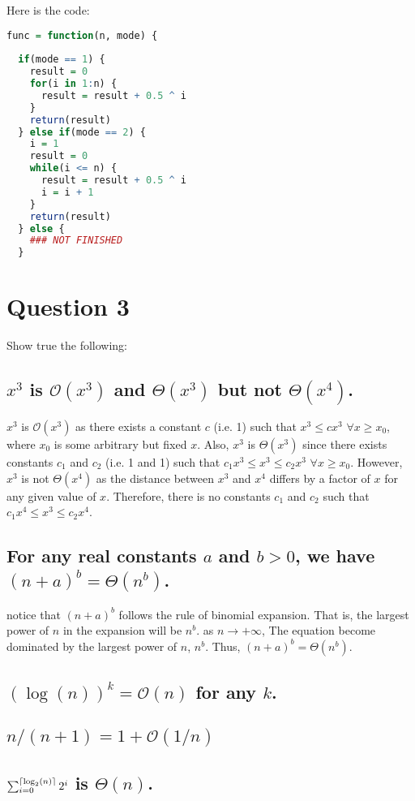 \documentclass[20pt]{article} %
\DeclarePairedDelimiter\ceil{\lceil}{\rceil}
\begin{document}
Here is the code:

\begin{lstlisting}[language=R]
func = function(n, mode) {
  
  if(mode == 1) {
    result = 0
    for(i in 1:n) {
      result = result + 0.5 ^ i
    }
    return(result)
  } else if(mode == 2) {
    i = 1
    result = 0
    while(i <= n) {
      result = result + 0.5 ^ i
      i = i + 1
    }
    return(result)
  } else {
    ### NOT FINISHED
  }
\end{lstlisting}

\section{Question 3}
Show true the following: 

\subsection{$x^{3}$ is $\mathcal{O}(x^{3})$ and $\Theta(x^{3})$ but not $\Theta(x^{4})$.}

$x^{3}$ is $\mathcal{O}(x^{3})$ as there exists a constant $c$ (i.e. 1) such that $x^{3} \leq cx^{3}$  $\forall x \geq x_0$, where $x_0$ is some arbitrary but fixed $x$. Also,  $x^{3}$ is $\Theta(x^{3})$ since there exists constants $c_1$ and $c_2$ (i.e. 1 and 1) such that $c_1x^{3} \leq x^{3} \leq c_2x^{3}$  $\forall x \geq x_0$.  However, $x^{3}$ is not $\Theta(x^{4})$ as the distance between $x^{3}$ and $x^{4}$ differs by a factor of $x$ for any given value of $x$.  Therefore, there is no constants $c_1$ and $c_2$ such that $c_1x^{4} \leq x^{3} \leq c_2x^{4}$.

\subsection{For any real constants $a$ and $b>0$, we have $(n+a)^{b} = \Theta(n^{b})$.}

notice that $(n+a)^{b}$ follows the rule of binomial expansion. That is, the largest power of $n$ in the expansion will be $n^{b}$.  as $n\rightarrow +\infty$, The equation become dominated by the largest power of $n$, $n^{b}$.  Thus, $(n+a)^{b} = \Theta(n^{b})$.

\subsection{$(\log(n))^{k} = \mathcal{O}(n)$ for any $k$.}

\subsection{$n/(n+1) = 1 + \mathcal{O}(1/n)$}

\subsection{$\sum_{i=0}^{\ceil{\log_2(n)}} 2^{i}$ is $\Theta(n)$.}
\end{document}
